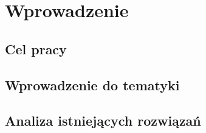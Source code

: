 \newpage %
\section{Wprowadzenie}
\subsection{Cel pracy}
\subsection{Wprowadzenie do tematyki}
\subsection{Analiza istniejących rozwiązań}
